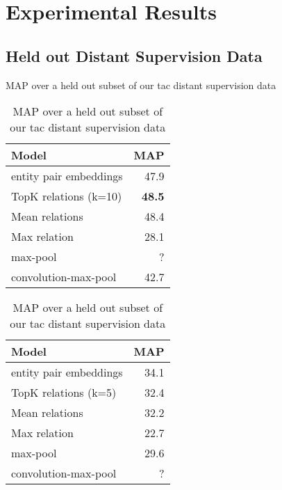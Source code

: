 \section{Experimental Results\label{sec:results}}


\subsection {Held out Distant Supervision Data}
MAP over a held out subset of our tac distant supervision data


\begin{table}[h!]
\setlength{\tabcolsep}{4.1pt}
\begin{center}
\begin{tabular}{|lr|}
\hline
\bf Model & MAP \\
\hline\hline
entity pair embeddings      & 47.9 \\
TopK relations (k=10)       & \bf48.5  \\
Mean relations              & 48.4 \\
Max relation                & 28.1  \\
\hline\hline
max-pool                    & ? \\
convolution-max-pool        & 42.7 \\
\hline

\hline
\end{tabular}
\caption{MAP over a held out subset of our tac distant supervision data
\label{distant-supervision-table}}
\end{center}
\vspace{-.3cm}
\end{table}

\begin{table}[h!]
\setlength{\tabcolsep}{4.1pt}
\begin{center}
\begin{tabular}{|lr|}
\hline
\bf Model & MAP \\
\hline\hline
entity pair embeddings      & 34.1 \\
TopK relations (k=5)       & 32.4  \\
Mean relations              & 32.2 \\
Max relation                & 22.7  \\
\hline\hline
max-pool                    & 29.6 \\
convolution-max-pool        & ? \\
\hline

\hline
\end{tabular}
\caption{MAP over a held out subset of our tac distant supervision data
\label{distant-supervision-table}}
\end{center}
\vspace{-.3cm}
\end{table}


